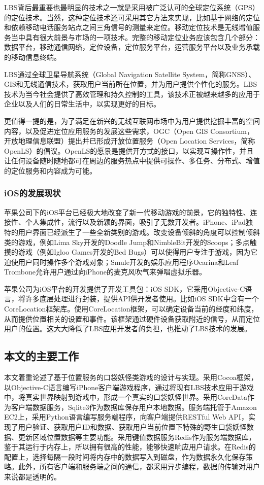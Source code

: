 \documentclass{article}
\begin{document}
\begin{CJK}{UTF8}{gbsn}
  LBS背后最重要也最明显的技术之一就是采用被广泛认可的全球定位系统（GPS）的定位技术。当然，这种定位技术还可采用其它方法来实现，比如基于网络的定位和依赖移动电话服务站点之间三角信号的测量来定位\cite{L01}。移动定位技术是无线增值服务当中具有很大前景与市场的一项技术。完整的移动定位业务应该包含几个部分：数据平台，移动通信网络，定位设备，定位服务平台，运营服务平台以及业务承载的移动信息终端\cite{L07}。

  LBS通过全球卫星导航系统（Global Navigation Satellite System，简称GNSS）、GIS和无线通信技术，获取用户当前所在位置，并为用户提供个性化的服务。LBS技术为当今社会提供了高效管理和持久控制的工具，该技术正被越来越多的应用于企业以及人们的日常生活中，以实现更好的目标\cite{L01}。

  更值得一提的是，为了满足在新兴的无线互联网市场中为用户提供挖掘丰富的空间内容，以及促进定位应用服务的发展这些需求，OGC（Open GIS Consortium，开放地理信息联盟）提出并已形成开放位置服务（Open Location Services，简称OpenLS）的倡议。OpenLS的愿景是提供开方式的接口，以实现互操作性，并且让任何设备随时随地都可在周边的服务热点中提供可操作、多任务、分布式、增值的定位服务和内容成为可能\cite{L13}。

	\subsubsection{iOS的发展现状}
  苹果公司下的iOS平台已经极大地改变了新一代移动游戏的前景，它的独特性、连接性、个人集成性，流行以及新颖的界面，吸引了无数开发者。iPhone、iPad独特的用户界面已经派生了一些全新类别的游戏。改变设备倾斜的角度可以控制倾斜类的游戏，例如Lima Sky开发的Doodle Jump和NimbleBit开发的Scoops；多点触摸的游戏（例如Igloo Games开发的Bed Bugs）可以使得用户专注于游戏，因为它迫使用户同时操作多个游戏对象；Smule开发的娱乐应用程序Ocarina和Leaf Trombone允许用户通过向iPhone的麦克风吹气来弹唱虚拟乐器\cite{B02}。

  苹果公司为iOS平台的开发提供了开发工具包：iOS SDK，它采用Objective-C语言，将许多底层处理进行封装，提供API供开发者使用。比如iOS SDK中含有一个CoreLocation框架库。使用CoreLocation框架，可以确定设备当前的经度和纬度，从而提供位置相关的设置和事件。该框架通过硬件设备获取附近的信号，从而定位用户的位置\cite{iOSLIB}。这大大降低了LBS应用开发者的负担，也推动了LBS技术的发展。

	\subsection{本文的主要工作}
  本文着重论述了基于位置服务的口袋妖怪类游戏的设计与实现。采用Cocoa框架，以Objective-C语言编写iPhone客户端游戏程序，通过将现有LBS技术应用于游戏中，将真实世界映射到游戏中，形成一个真实的口袋妖怪世界。采用CoreData作为客户端数据服务，Sqlite3作为数据库保存用户本地数据。服务端托管于Amazon EC2上，采用Python语言编写服务端程序，向客户端提供RESTful Web API，实现了用户验证、获取用户ID和数据、获取用户当前位置下特殊的野生口袋妖怪数据、更新区域位置数据等主要功能。采用键值数据服务Redis作为服务端数据库，鉴于其运行于内存上，所以拥有很高的性能，能够快速响应用户请求。在Redis的配置上，选择每隔一段时间将内存中的数据写入到磁盘，作为数据永久化保存策略。此外，所有客户端和服务端之间的通信，都采用异步编程，数据的传输对用户来说都是透明的。


\end{CJK}
\end{document}
